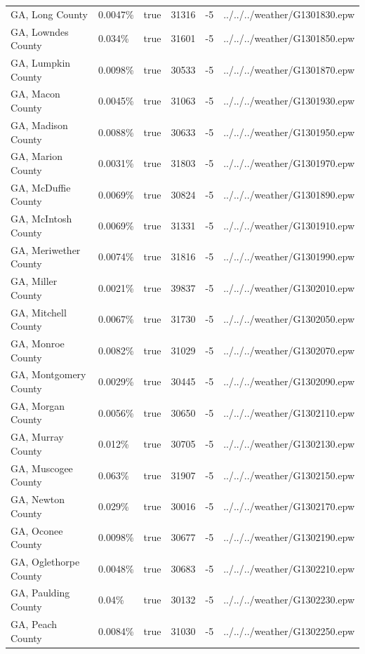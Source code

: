 \begin{longtable}[]{@{}llllll@{}}
GA, Long County & 0.0047\% & true & 31316 & -5 &
../../../weather/G1301830.epw \\
GA, Lowndes County & 0.034\% & true & 31601 & -5 &
../../../weather/G1301850.epw \\
GA, Lumpkin County & 0.0098\% & true & 30533 & -5 &
../../../weather/G1301870.epw \\
GA, Macon County & 0.0045\% & true & 31063 & -5 &
../../../weather/G1301930.epw \\
GA, Madison County & 0.0088\% & true & 30633 & -5 &
../../../weather/G1301950.epw \\
GA, Marion County & 0.0031\% & true & 31803 & -5 &
../../../weather/G1301970.epw \\
GA, McDuffie County & 0.0069\% & true & 30824 & -5 &
../../../weather/G1301890.epw \\
GA, McIntosh County & 0.0069\% & true & 31331 & -5 &
../../../weather/G1301910.epw \\
GA, Meriwether County & 0.0074\% & true & 31816 & -5 &
../../../weather/G1301990.epw \\
GA, Miller County & 0.0021\% & true & 39837 & -5 &
../../../weather/G1302010.epw \\
GA, Mitchell County & 0.0067\% & true & 31730 & -5 &
../../../weather/G1302050.epw \\
GA, Monroe County & 0.0082\% & true & 31029 & -5 &
../../../weather/G1302070.epw \\
GA, Montgomery County & 0.0029\% & true & 30445 & -5 &
../../../weather/G1302090.epw \\
GA, Morgan County & 0.0056\% & true & 30650 & -5 &
../../../weather/G1302110.epw \\
GA, Murray County & 0.012\% & true & 30705 & -5 &
../../../weather/G1302130.epw \\
GA, Muscogee County & 0.063\% & true & 31907 & -5 &
../../../weather/G1302150.epw \\
GA, Newton County & 0.029\% & true & 30016 & -5 &
../../../weather/G1302170.epw \\
GA, Oconee County & 0.0098\% & true & 30677 & -5 &
../../../weather/G1302190.epw \\
GA, Oglethorpe County & 0.0048\% & true & 30683 & -5 &
../../../weather/G1302210.epw \\
GA, Paulding County & 0.04\% & true & 30132 & -5 &
../../../weather/G1302230.epw \\
GA, Peach County & 0.0084\% & true & 31030 & -5 &
../../../weather/G1302250.epw \\

\end{longtable}

